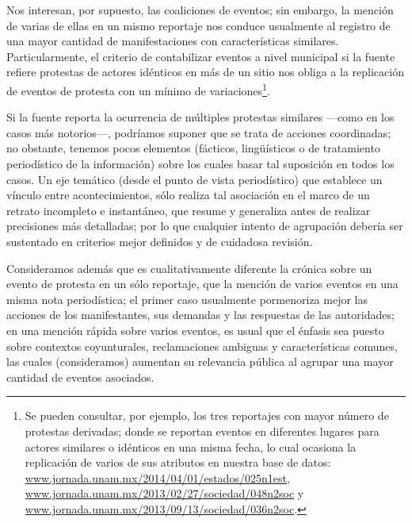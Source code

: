\documentclass[letterpaper, 11pt]{book}
\theoremstyle{definition}
\theoremstyle{remark}
\begin{document}
Nos interesan, por supuesto, las coaliciones de eventos; sin embargo, la mención de varias de ellas en un mismo reportaje nos conduce usualmente al registro de una mayor cantidad de manifestaciones con características similares. 
Particularmente, el criterio de contabilizar eventos a nivel municipal si la fuente refiere protestas de actores idénticos en más de un sitio nos obliga a la replicación de eventos de protesta con un mínimo de variaciones\footnote{
    Se pueden consultar, por ejemplo, los tres reportajes con mayor número de protestas derivadas; donde se reportan eventos en diferentes lugares para actores similares o idénticos en una misma fecha, lo cual ocasiona la replicación de varios de sus atributos en nuestra base de datos: \url{www.jornada.unam.mx/2014/04/01/estados/025n1est}, \url{www.jornada.unam.mx/2013/02/27/sociedad/048n2soc} y \url{www.jornada.unam.mx/2013/09/13/sociedad/036n2soc}. 
}. 

Si la fuente reporta la ocurrencia de múltiples protestas similares 
---como en los casos más notorios---, podríamos suponer que se trata de acciones coordinadas; no obstante, tenemos pocos elementos (fácticos, lingüísticos o de tratamiento periodístico de la información) sobre los cuales basar tal suposición en todos los casos. 
Un eje temático (desde el punto de vista periodístico) que establece un vínculo entre acontecimientos, sólo realiza tal asociación en el marco de un retrato incompleto e instantáneo, que resume y generaliza antes de realizar precisiones más detalladas; por lo que cualquier intento de agrupación debería ser sustentado en criterios mejor definidos y de cuidadosa revisión.

Consideramos además que es cualitativamente diferente la crónica sobre un evento de protesta en un sólo reportaje, que la mención de varios eventos en una misma nota periodística; el primer caso usualmente pormenoriza mejor las acciones de los manifestantes, sus demandas y las respuestas de las autoridades; en una mención rápida sobre varios eventos, es usual que el énfasis sea puesto sobre contextos coyunturales, reclamaciones ambiguas y características comunes, las cuales (consideramos) aumentan su relevancia pública al agrupar una mayor cantidad de eventos asociados. 
\end{document}
